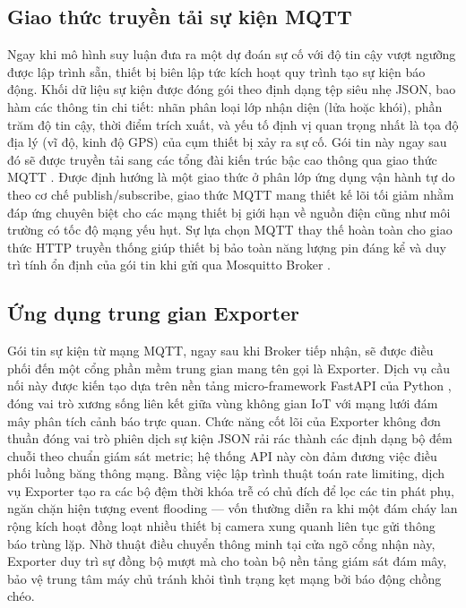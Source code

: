 \documentclass[12pt,a4paper]{report}
\begin{document}
\subsection{Giao thức truyền tải sự kiện MQTT}
Ngay khi mô hình suy luận đưa ra một dự đoán sự cố với độ tin cậy vượt ngưỡng được lập trình sẵn, thiết bị biên lập tức kích hoạt quy trình tạo sự kiện báo động. Khối dữ liệu sự kiện được đóng gói theo định dạng tệp siêu nhẹ JSON, bao hàm các thông tin chi tiết: nhãn phân loại lớp nhận diện (lửa hoặc khói), phần trăm độ tin cậy, thời điểm trích xuất, và yếu tố định vị quan trọng nhất là tọa độ địa lý (vĩ độ, kinh độ GPS) của cụm thiết bị xảy ra sự cố. Gói tin này ngay sau đó sẽ được truyền tải sang các tổng đài kiến trúc bậc cao thông qua giao thức MQTT \cite{mqtt}. Được định hướng là một giao thức ở phân lớp ứng dụng vận hành tự do theo cơ chế publish/subscribe, giao thức MQTT mang thiết kế lõi tối giảm nhằm đáp ứng chuyên biệt cho các mạng thiết bị giới hạn về nguồn điện cũng như môi trường có tốc độ mạng yếu hụt. Sự lựa chọn MQTT thay thế hoàn toàn cho giao thức HTTP truyền thống giúp thiết bị bảo toàn năng lượng pin đáng kể và duy trì tính ổn định của gói tin khi gửi qua Mosquitto Broker \cite{mosquitto}.

\subsection{Ứng dụng trung gian Exporter}
Gói tin sự kiện từ mạng MQTT, ngay sau khi Broker tiếp nhận, sẽ được điều phối đến một cổng phần mềm trung gian mang tên gọi là Exporter. Dịch vụ cầu nối này được kiến tạo dựa trên nền tảng micro-framework FastAPI của Python \cite{fastapi}, đóng vai trò xương sống liên kết giữa vùng không gian IoT với mạng lưới đám mây phân tích cảnh báo trực quan. Chức năng cốt lõi của Exporter không đơn thuần đóng vai trò phiên dịch sự kiện JSON rải rác thành các định dạng bộ đếm chuỗi theo chuẩn giám sát metric; hệ thống API này còn đảm đương việc điều phối luồng băng thông mạng. Bằng việc lập trình thuật toán rate limiting, dịch vụ Exporter tạo ra các bộ đệm thời khóa trễ có chủ đích để lọc các tin phát phụ, ngăn chặn hiện tượng event flooding --- vốn thường diễn ra khi một đám cháy lan rộng kích hoạt đồng loạt nhiều thiết bị camera xung quanh liên tục gửi thông báo trùng lặp. Nhờ thuật điều chuyển thông minh tại cửa ngõ cổng nhận này, Exporter duy trì sự đồng bộ mượt mà cho toàn bộ nền tảng giám sát đám mây, bảo vệ trung tâm máy chủ tránh khỏi tình trạng kẹt mạng bởi báo động chồng chéo.
\end{document}
